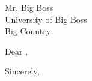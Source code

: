 \documentclass[11pt]{letter}
\makeatletter
\renewcommand\title[1]{
    \setlength{\parskip}{1.5\parskip}
    \renewcommand\opening[1]{\begin{center}\Large\textbf{#1}\end{center}\vspace\parskip}
    \signature{
        \newlength\underlinelength
        \settowidth\underlinelength\fromname
        \addtolength\underlinelength{2ex}
        \rule\underlinelength\linethickness\\
        \hspace*{1ex}\fromname
    }
    \let\oldclosing\closing
    \renewcommand\closing[1]{\oldclosing{\fromlocation, \@date}}
}
\makeatother
\begin{document}

\begin{letter}
{
    Mr. Big Boss\\
    University of Big Boss\\
    Big Country
}
\address{
    Central China Normal University\\
    Institute of Particle Physics\\
    152 Luoyu Rd., \textsc{ccnu}, Bldg. 9, 423\\
    430079 Hongshan District\\
    \fromlocation, Hubei Province\\
    P. R. of China
}
\date{\today}


\opening{Dear \toname,}



\closing{Sincerely,}
\end{letter}
\end{document}
